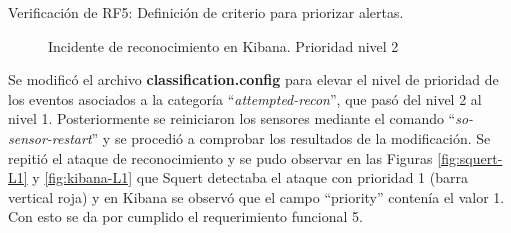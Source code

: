 \begin{section}{Verificación de RF5: Definición de criterio para priorizar alertas.}
\begin{figure}[H]
    \caption{Incidente de reconocimiento en Kibana. Prioridad nivel 2}
   \label{fig:Kibana-L2}
    \end{figure}
    \FloatBarrier
    Se modificó el archivo \textbf{classification.config} para elevar el nivel de prioridad de los eventos asociados a la categoría “\textit{attempted-recon}”, que pasó del nivel 2 al nivel 1. Posteriormente se reiniciaron los sensores mediante el comando “\textit{so-sensor-restart}” y se procedió a comprobar los resultados de la modificación. Se repitió el ataque de reconocimiento y se pudo observar en las Figuras \ref{fig:squert-L1} y \ref{fig:kibana-L1} que Squert detectaba el ataque con prioridad 1 (barra vertical roja) y en Kibana se observó que el campo “priority” contenía el valor 1. Con esto se da por cumplido el requerimiento funcional 5.
    

\end{section}
